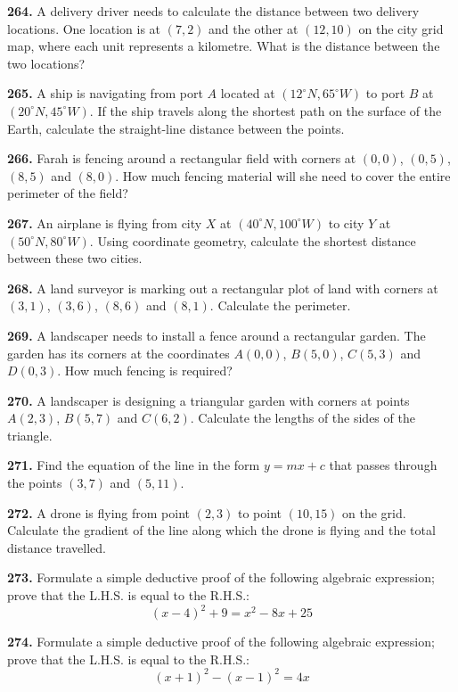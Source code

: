 \documentclass[11pt]{article}
\begin{document}
\bigskip
\noindent\textbf{264.} A delivery driver needs to calculate the distance between two delivery locations. One location is at $(7,2)$ and the other at $(12,10)$ on the city grid map, where each unit represents a kilometre. What is the distance between the two locations?

\bigskip
\noindent\textbf{265.} A ship is navigating from port $A$ located at $(12^{\circ}N, 65^{\circ}W)$ to port $B$ at $(20^{\circ}N, 45^{\circ}W)$. If the ship travels along the shortest path on the surface of the Earth, calculate the straight-line distance between the points.

\bigskip
\noindent\textbf{266.} Farah is fencing around a rectangular field with corners at $(0,0)$, $(0,5)$, $(8,5)$ and $(8,0)$. How much fencing material will she need to cover the entire perimeter of the field?

\bigskip
\noindent\textbf{267.} An airplane is flying from city $X$ at $(40^{\circ}N, 100^{\circ}W)$ to city $Y$ at $(50^{\circ}N, 80^{\circ}W)$. Using coordinate geometry, calculate the shortest distance between these two cities.

\bigskip
\noindent\textbf{268.} A land surveyor is marking out a rectangular plot of land with corners at $(3,1)$, $(3,6)$, $(8,6)$ and $(8,1)$. Calculate the perimeter.

\bigskip
\noindent\textbf{269.} A landscaper needs to install a fence around a rectangular garden. The garden has its corners at the coordinates $A(0,0)$, $B(5,0)$, $C(5,3)$ and $D(0,3)$. How much fencing is required?

\bigskip
\noindent\textbf{270.} A landscaper is designing a triangular garden with corners at points $A(2,3)$, $B(5,7)$ and $C(6,2)$. Calculate the lengths of the sides of the triangle.

\bigskip
\noindent\textbf{271.} Find the equation of the line in the form $y = mx + c$ that passes through the points $(3,7)$ and $(5,11)$.

\bigskip
\noindent\textbf{272.} A drone is flying from point $(2,3)$ to point $(10,15)$ on the grid. Calculate the gradient of the line along which the drone is flying and the total distance travelled.

\bigskip
\noindent\textbf{273.} Formulate a simple deductive proof of the following algebraic expression; prove that the L.H.S. is equal to the R.H.S.:
\[
(x-4)^2 + 9 = x^2 - 8x + 25
\]

\bigskip
\noindent\textbf{274.} Formulate a simple deductive proof of the following algebraic expression; prove that the L.H.S. is equal to the R.H.S.:
\[
(x+1)^2 - (x-1)^2 = 4x
\]
\end{document}
